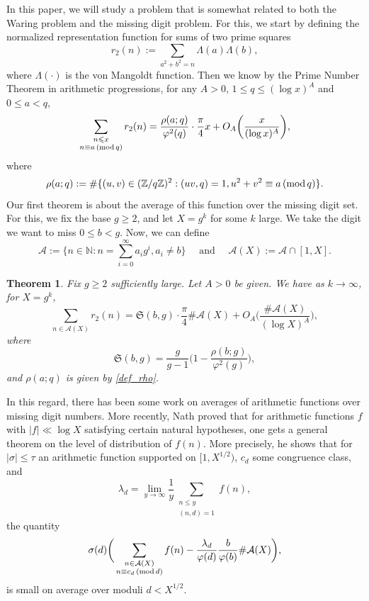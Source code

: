 \documentclass[12pt]{amsart}
\newtheorem{thm}{Theorem}[section]
\theoremstyle{definition}
\theoremstyle{definition}
\theoremstyle{remark}
\numberwithin{equation}{section}
\newcommand{\N}{\mathbb{N}}
\newcommand{\Z}{\mathbb{Z}}
\newcommand{\CA}{\mathcal{A}}
\renewcommand{\geq}{\geqslant}
\renewcommand{\leq}{\leqslant}
\renewcommand{\mod}[1]{\,({\rm mod}\,#1)}
\begin{document}
In this paper, we will study a problem that is somewhat related to both the Waring problem and the missing digit problem. For this, we start by defining the normalized representation function for sums of two prime squares
$$ r_2(n) := \sum_{a^2+b^2=n} \Lambda(a)\Lambda(b), $$
where $\Lambda(\cdot)$ is the von Mangoldt function.
Then we know by the Prime Number Theorem in arithmetic progressions, for any $A>0$, $1\leq q\leq (\log x)^A$ and $0\leq a< q$,
$$ \sum_{\substack{n\leq x \\ n\equiv a \mod q}} r_2(n) =  \frac{\rho(a;q)}{\varphi^2(q)} \cdot \frac{\pi}{4} x + O_A \bigg( \frac{x}{(\log x)^A}\bigg), $$
where 
\begin{equation}\label{def_rho}
\rho(a;q):=\#\{ (u,v)\in (\Z/q\Z)^2 : (uv,q)=1,  u^2+v^2\equiv a \mod q \}.
\end{equation}
Our first theorem is about the average of this function over the missing digit set. For this, we fix the base $g\geq 2$, and let $X=g^k$ for some $k$ large. We take the digit we want to miss $0\leq b < g$. Now, we can define
\begin{equation}\label{def_A}
\CA := \{n \in \N : n=\sum_{i=0}^{\infty} a_i g^i , a_i\not=b\} \quad \text{ and } \quad \CA(X) := \CA \cap [1,X]. 
\end{equation}
\begin{thm}\label{averaging_result}
Fix $g\geq 2$ sufficiently large. Let $A>0$ be given. We have as $k\to\infty$, for $X=g^k$,
\begin{equation}\label{average_sum}
\sum_{n\in \CA(X)} r_2(n) = \mathfrak{S}(b,g) \cdot \frac{\pi}{4} \#\CA(X) + O_{A}\bigg( \frac{\#\CA(X)}{(\log X)^A} \bigg) ,
\end{equation}
where 
$$ \mathfrak{S}(b,g)=\frac{g}{g-1} \bigg( 1 - \frac{\rho(b;g)}{\varphi^2(g)} \bigg) ,$$
and $\rho(a;q)$ is given by \eqref{def_rho}. 
\end{thm}
In this regard, there has been some work on averages of arithmetic functions over missing digit numbers. More recently, Nath \cite[Theorem 7]{MR4680227} proved that for arithmetic functions $f$ with $|f| \ll \log X$ satisfying certain natural hypotheses, one gets a general theorem on the level of distribution of $f(n)$. More precisely, he shows that for $|\sigma|\leq \tau$ an arithmetic function supported on $[1,X^{1/2})$, $c_d$ some congruence class, and
$$\lambda_d = \lim_{y\to\infty} \frac{1}{y}\sum_{\substack{n\leq y \\ (n,d)=1}} f(n),$$
the quantity
$$\sigma(d) \bigg(\sum_{\substack{n\in \mathcal{A}(X) \\ n\equiv c_d \mod d}} f(n)- \frac{\lambda_d}{\varphi(d)}\frac{b}{\varphi(b)} \#\mathcal{A}(X) \bigg)  , $$
is small on average over moduli $d < X^{1/2}$.
\end{document}
